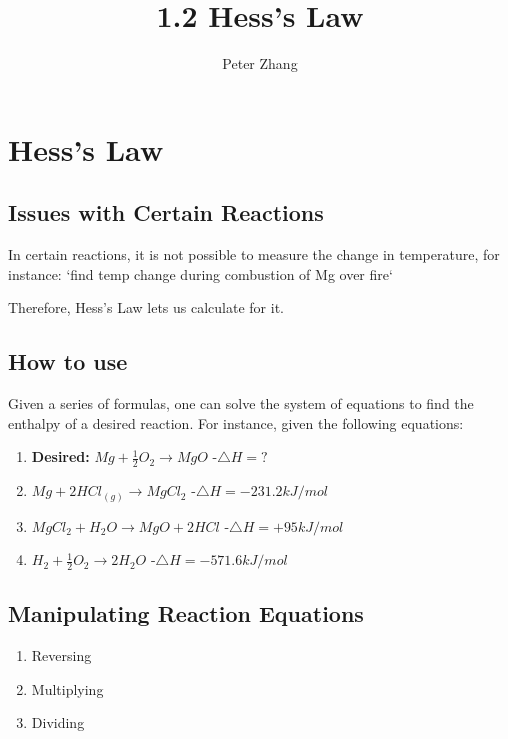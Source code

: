 \documentclass[12pt]{article} %
\title{1.2 Hess's Law}
\author{Peter Zhang}
\begin{document}
\maketitle

\pagebreak

\tableofcontents

\pagebreak

\section{Hess's Law}

\subsection{Issues with Certain Reactions}
In certain reactions, it is not possible to measure the change in temperature, for instance: `find temp change during combustion of Mg over fire`


Therefore, Hess's Law lets us calculate for it.

\subsection{How to use}

Given a series of formulas, one can solve the system of equations to find the enthalpy of a desired reaction. For instance, given the following equations:

\begin{enumerate}
\item \textbf{Desired:} $Mg + \frac{1}{2}O_2 \rightarrow MgO$ -$\triangle{H} = ?$
\item $Mg + 2HCl_{(g)} \rightarrow MgCl_2$ -$\triangle{H} = -231.2kJ/mol$
\item $MgCl_2 + H_2O \rightarrow MgO + 2HCl$ -$\triangle{H} = +95kJ/mol$
\item $H_2 + \frac{1}{2}O_2 \rightarrow 2H_2O$ -$\triangle{H} = -571.6kJ/mol$
\end{enumerate}

\subsection{Manipulating Reaction Equations}

\begin{enumerate}
\item Reversing
\item Multiplying
\item Dividing
\end{enumerate}
\end{document}
